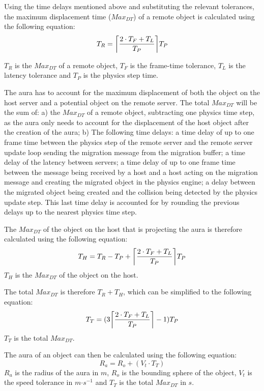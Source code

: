 Using the time delays mentioned above and substituting the relevant tolerances, the maximum displacement time ($Max_{DT}$) of a remote object is calculated using the following equation:
\DeclarePairedDelimiter\ceil{\lceil}{\rceil}
\begin{equation}
T_{R}=\ceil*{\frac{2\cdot T_{F} + T_{L}}{T_{P}}}T_{P}
\end{equation}

$T_{R}$ is the $Max_{DT}$ of a remote object, $T_{F}$ is the frame-time tolerance, $T_{L}$ is the latency tolerance and $T_{P}$ is the physics step time.

The aura has to account for the maximum displacement of both the object on the host server and a potential object on the remote server. The total $Max_{DT}$ will be the sum of: a) the $Max_{DT}$ of a remote object, subtracting one physics time step, as the aura only needs to account for the displacement of the host object after the creation of the aura; b) The following time delays: a time delay of up to one frame time between the physics step of the remote server and the remote server update loop sending the migration message from the migration buffer; a time delay of the latency between servers; a time delay of up to one frame time between the message being received by a host and a host acting on the migration message and creating the migrated object in the physics engine; a delay between the migrated object being created and the collision being detected by the physics update step. This last time delay is accounted for by rounding the previous delays up to the nearest physics time step.

The $Max_{DT}$ of the object on the host that is projecting the aura is therefore calculated using the following equation:
\begin{equation}
T_{H}=T_{R}-T_{P}+\ceil*{\frac{2\cdot T_{F} + T_{L}}{T_{P}}}T_{P}
\end{equation}
$T_{H}$ is the $Max_{DT}$ of the object on the host.

The total $Max_{DT}$ is therefore $T_{R}+T_{H}$, which can be simplified to the following equation:
\begin{equation}
T_{T}=(3\ceil*{\frac{2\cdot T_{F} + T_{L}}{T_{P}}}-1)T_{P}
\end{equation}
$T_{T}$ is the total $Max_{DT}$.

The aura of an object can then be calculated using the following equation: 
\begin{equation}
R_{a}=R_{o}+(V_{t}\cdot T_{T})
\end{equation}
$R_{a}$ is the radius of the aura in $m$, $R_{o}$ is the bounding sphere of the object, $V_{t}$ is the speed tolerance in $m\mathord{\cdot}s^{-1}$ and $T_{T}$ is the total $Max_{DT}$ in $s$.


